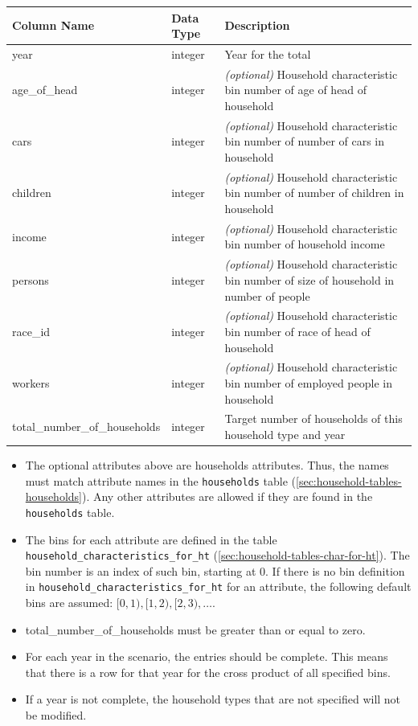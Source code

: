\begin{tabular}{llp{4in}}
\textbf{Column Name} & \textbf{Data Type} & \textbf{Description} \\
\hline
year & integer & Year for the total  \\
\hline
age_of_head & integer & \emph{(optional) }
Household characteristic bin number of age of head of household  \\
\hline
cars & integer & \emph{(optional) }
Household characteristic bin number of number of cars in household  \\
\hline
children & integer & \emph{(optional) }
Household characteristic bin number of number of children in household  \\
\hline
income & integer & \emph{(optional) }
Household characteristic bin number of household income  \\
\hline
persons & integer & \emph{(optional) }
Household characteristic bin number of size of household in number of people  \\
\hline
race_id & integer & \emph{(optional) }
Household characteristic bin number of race of head of household  \\
\hline
workers & integer & \emph{(optional) }
Household characteristic bin number of employed people in household  \\
\hline
total_number_of_households & integer & Target number of households of this household type and year  \\
\hline

\end{tabular}

\begin{itemize} \tight
\item The optional attributes above are households attributes. Thus, the names must match
attribute names in the {\tt households} table (\ref{sec:household-tables-households}). 
Any other attributes are allowed if they are found in the  {\tt households} table.
\item The bins for each attribute are defined in the table {\tt household_characteristics_for_ht}
(\ref{sec:household-tables-char-for-ht}).
The bin number is an index of such bin, starting at 0. If there is no bin definition in {\tt household_characteristics_for_ht}
for an attribute, the following default bins are assumed: $[0,1), [1, 2), [2,3), \dots$.
\item total_number_of_households must be greater than or equal to zero.
\item For each year in the scenario, the
entries should be complete. This means that there is a row for that year for
the cross product of all specified bins.
\item If a year is not complete, the household types that are not specified
will not be modified.
\end{itemize}

